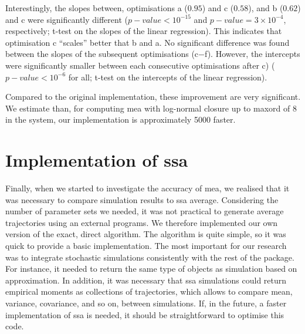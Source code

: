 Interestingly, the slopes between, optimisations a ($0.95$) and c ($0.58$), and b ($0.62$) and c were significantly different ($p-value <10^{-15}$ and $p-value = 3 \times 10^{-4}$, respectively;
t-test on the slopes of the linear regression). This indicates that optimisation c ``scales'' better that b and a.
No significant difference was found between the slopes of the subsequent optimisations (c$-$f).
However, the intercepts were significantly smaller between each consecutive optimisations after c) ($p-value < 10^{-6}$ for all; t-test on the intercepts of the linear regression).

Compared to the original \mat{} implementation, these improvement are very significant. We estimate than, for computing \gls{mea} with log-normal closure up to \gls{maxord}
of 8 in the \pft{} system, our implementation is approximately 5000 faster.

\section{Implementation of \acrlong{ssa}}
Finally, when we started to investigate the accuracy of \gls{mea}, we realised that it was necessary to compare simulation results to \gls{ssa} average\cite{gillespie_general_1976}.
Considering the number of parameter sets we needed, it was not practical to generate average trajectories using an external programs.
We therefore implemented our own version of the exact, direct algorithm.
The algorithm is quite simple, so it was quick to provide a basic implementation.
The most important for our research was to integrate stochastic simulations consistently with the rest of the package.
For instance, it needed to return the same type of objects as simulation based on approximation.
In addition, it was necessary that \gls{ssa} simulations could return empirical moments as collections of trajectories,
which allows to compare mean, variance, covariance, and so on, between simulations.
If, in the future, a faster implementation of \gls{ssa} is needed, it should be straightforward to optimise this code.



